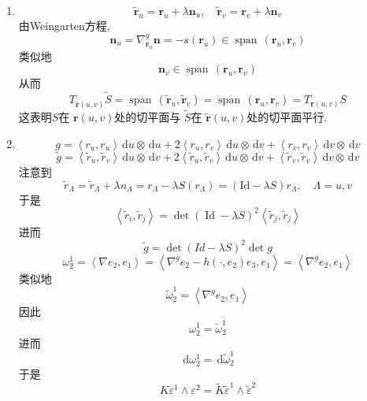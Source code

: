 \documentclass[../../main.tex]{subfiles}
\begin{document}
\begin{solution}
    \begin{enumerate}
        \item \[
        \tilde{\mathbf{r}}_{u}= \mathbf{r}_{u}+  \lambda \mathbf{n}_{u},\quad \tilde{\mathbf{r}}_{v}= \mathbf{r}_{v}+  \lambda \mathbf{n}_{v}
        \] 由Weingarten方程,\[
         \mathbf{n}_{u}=  \nabla ^{g} _{\mathbf{r}_{u}}\mathbf{n}= -s\left( \mathbf{r}_{u} \right)\in \operatorname{span}\,\left( \mathbf{r}_{u},\mathbf{r}_{v} \right) 
        \]类似地 \[
        \mathbf{n}_{v}\in \operatorname{span}\,\left( \mathbf{r}_{u},\mathbf{r}_{v} \right) 
        \]从而 \[
        T_{\tilde{\mathbf{r}}\left( u,v \right) }\tilde{S}= \operatorname{span}\,\left( \mathbf{\tilde{r}}_{u}, \mathbf{\tilde{r}}_{v} \right)= \operatorname{span}\,\left( \mathbf{r}_{u},\mathbf{r}_{v} \right)  = T_{\mathbf{r}\left( u,v \right) }S
        \]这表明\(  S  \)在 \(  \mathbf{r}\left( u,v \right)   \)处的切平面与 \(  \tilde{S}  \)在 \(  \tilde{\mathbf{r}}\left( u,v \right)   \)处的切平面平行.
        \item  \[
        g = \left<r_{u},r_{u} \right>\,\mathrm{d} u\otimes \,\mathrm{d} u+ 2\left<r_{u},r_{v} \right>\,\mathrm{d} u\otimes \,\mathrm{d} v+ \left<r_{v},r_{v} \right> \,\mathrm{d} v\otimes \,\mathrm{d} v
        \] \[
        \tilde{g}= \left<\tilde{r}_{u},\tilde{r}_{v} \right>\,\mathrm{d} u\otimes \,\mathrm{d} v+ 2\left<\tilde{r}_{u},\tilde{r}_{v} \right>\,\mathrm{d} u\otimes \,\mathrm{d} v+ \left<\tilde{r}_{v},\tilde{r}_{v} \right>\,\mathrm{d} v\otimes \,\mathrm{d} v
        \]注意到 \[
        \tilde{r}_{ \Lambda  }= \tilde{r}_{ \Lambda }+  \lambda n_{ \Lambda }= r_{ \Lambda }- \lambda S\left( r_{ \Lambda } \right)= \left( \mathrm{Id}- \lambda S \right)r_{ \Lambda },\quad  \Lambda = u,v  
        \]于是 \[
        \left<\tilde{r}_{i},\tilde{r}_{j} \right>= \det \left( \operatorname{Id}- \lambda S \right) ^{2}\left<\tilde{r}_{j},\tilde{r}_{j} \right>
        \] 进而 \[
        \tilde{g}= \det \left( Id-  \lambda S \right)^{2}\det g 
        \]\[
         \omega _{2}^{1}= \left< \nabla e_{2},e_1 \right>= \left< \nabla ^{g}e_2-h\left( \cdot ,e_2 \right)e_3,e_1  \right>= \left< \nabla ^{g}e_2,e_1 \right>
        \]类似地 \[
         \tilde{\omega} _{2}^{1}= \left< \nabla ^{g}e_2,e_1 \right>
        \]因此 \[
         \omega _{2}^{1}=  \tilde{\omega}_{2}^{1}
        \]进而 \[
        \,\mathrm{d}  \omega _{2}^{1}= \,\mathrm{d}  \tilde{\omega} _{2}^{1}
        \]于是 \[
        K  \varepsilon ^{1}\wedge  \varepsilon ^{2}= \tilde{K} \tilde{\varepsilon} ^{1}\wedge  \tilde{\varepsilon} ^{2}
\]
\end{enumerate}
\end{solution}
\end{document}
